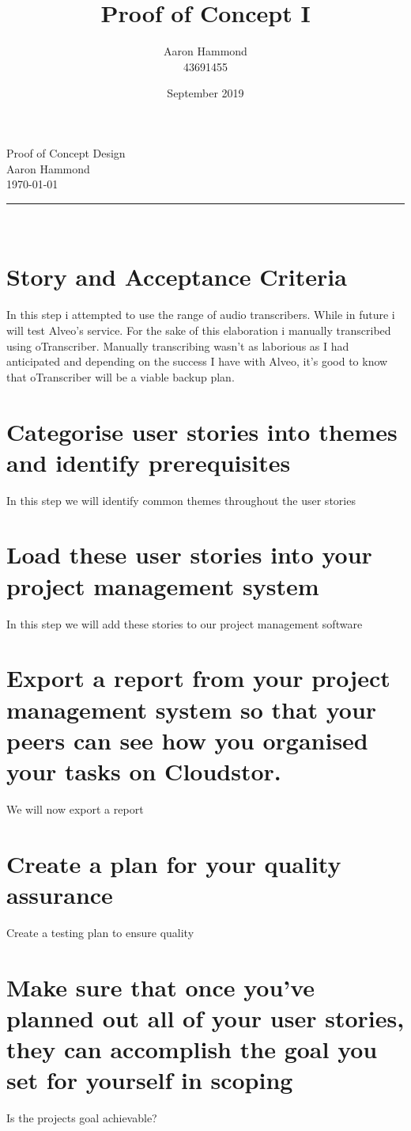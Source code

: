 \documentclass{article}
\title{Proof of Concept I}
\author{Aaron Hammond\\43691455}
\date{September 2019}
\newcommand\HRule{\rule{\textwidth}{1pt}} %
\begin{document}
\begin{center}
\huge{Proof of Concept Design}\\[0.4cm]
\huge{Aaron Hammond}\\[0.3cm]
\large{\today}\\[0.4cm]

\HRule \\[1cm]
\end{center}


\section{Story and Acceptance Criteria}
In this step i attempted to use the range of audio transcribers. While in future i will test Alveo's service. For the sake of this elaboration i manually transcribed using oTranscriber. Manually transcribing wasn't as laborious as I had anticipated and depending on the success I have with Alveo, it's good to know that oTranscriber will be a viable backup plan.

\section{Categorise user stories into themes and identify prerequisites}
In this step we will identify common themes throughout the user stories
\section{Load these user stories into your project management system}
In this step we will add these stories to our project management software
\section{Export a report from your project management system so that your peers can see how you organised your tasks on Cloudstor.}
We will now export a report
\section{Create a plan for your quality assurance}
Create a testing plan to ensure quality
\section{Make sure that once you’ve planned out all of your user stories, they can accomplish the goal you set for yourself in scoping}
Is the projects goal achievable?
\end{document}
